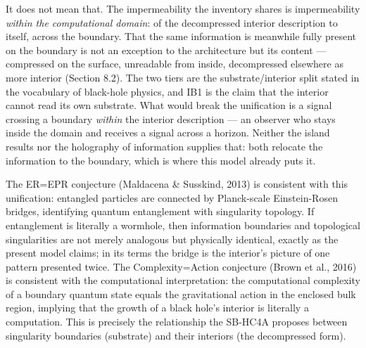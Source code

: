 \documentclass[
]{article}
\begin{document}
It does not mean that. The impermeability the inventory shares is
impermeability \emph{within the computational domain}: of the
decompressed interior description to itself, across the boundary. That
the same information is meanwhile fully present on the boundary is not
an exception to the architecture but its content --- compressed on the
surface, unreadable from inside, decompressed elsewhere as more interior
(Section 8.2). The two tiers are the substrate/interior split stated in
the vocabulary of black-hole physics, and IB1 is the claim that the
interior cannot read its own substrate. What would break the unification
is a signal crossing a boundary \emph{within} the interior description
--- an observer who stays inside the domain and receives a signal across
a horizon. Neither the island results nor the holography of information
supplies that: both relocate the information to the boundary, which is
where this model already puts it.

The ER=EPR conjecture (Maldacena \& Susskind, 2013) is consistent with
this unification: entangled particles are connected by Planck-scale
Einstein-Rosen bridges, identifying quantum entanglement with
singularity topology. If entanglement is literally a wormhole, then
information boundaries and topological singularities are not merely
analogous but physically identical, exactly as the present model claims;
in its terms the bridge is the interior's picture of one pattern
presented twice. The Complexity=Action conjecture (Brown et al., 2016)
is consistent with the computational interpretation: the computational
complexity of a boundary quantum state equals the gravitational action
in the enclosed bulk region, implying that the growth of a black hole's
interior is literally a computation. This is precisely the relationship
the SB-HC4A proposes between singularity boundaries (substrate) and
their interiors (the decompressed form).
\end{document}
